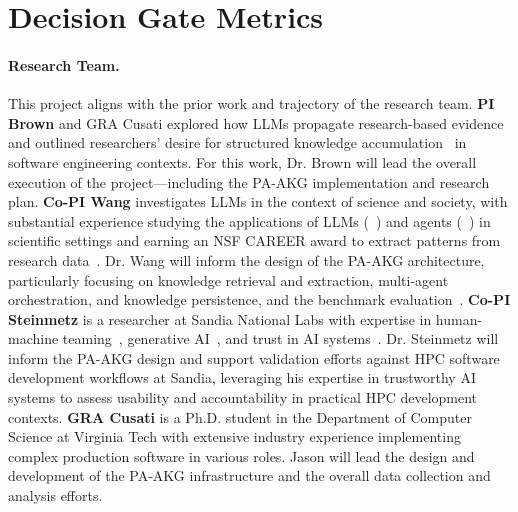 \documentclass{files/proposalnsf}
\begin{document}
\section{Decision Gate Metrics}


\paragraph{Research Team.} This project aligns with the prior work and trajectory of the research team.
\textbf{PI Brown} and GRA Cusati explored how LLMs propagate research-based evidence~\cite{brown2025esem} and outlined researchers' desire for structured knowledge accumulation~\cite{cusati2026fose} in software engineering contexts. For this work, Dr. Brown will lead the overall execution of the project---including the PA-AKG implementation and research plan. \textbf{Co-PI Wang} investigates LLMs in the context of science and society, with substantial experience studying the applications of LLMs (\ie~\cite{bi2024ai,srivastava2025llmthinkbench}) and agents (\ie~\cite{latimer2025hindsight,lu2024triageagent}) in scientific settings and earning an NSF CAREER award to extract patterns from research data~\cite{wang_career}. Dr. Wang will inform the design of the PA-AKG architecture, particularly focusing on knowledge retrieval and extraction, multi-agent orchestration, and knowledge persistence, and the benchmark evaluation~\cite{srivastava2025beyondbench}. \textbf{Co-PI Steinmetz} is a researcher at Sandia National Labs with expertise in human-machine teaming~\cite{chance2023towards,powell2021coordination}, generative AI~\cite{krofcheck2023overview,layton2025mstd}, and trust in AI systems~\cite{naugle2025trusted,steinmetz2025trust}. Dr. Steinmetz will inform the PA-AKG design and support validation efforts against HPC software development workflows at Sandia, leveraging his expertise in trustworthy AI systems to assess usability and accountability in practical HPC development contexts. \textbf{GRA Cusati} is a Ph.D. student in the Department of Computer Science at Virginia Tech with extensive industry experience implementing complex production software in various roles. Jason will lead the design and development of the PA-AKG infrastructure and the overall data collection and analysis efforts.
\end{document}
